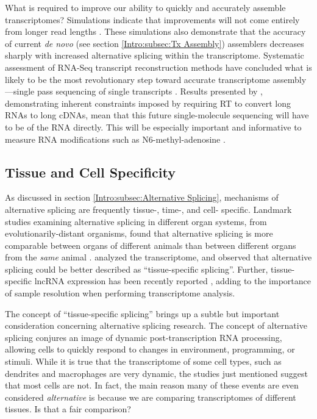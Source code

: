     What is required to improve our ability to quickly and accurately assemble transcriptomes? Simulations indicate that improvements will not come entirely from longer read lengths \citep{Chang2014c}. These simulations also demonstrate that the accuracy of current \textit{de novo} (see section \ref{Intro:subsec:Tx Assembly}) assemblers decreases sharply with increased alternative splicing within the transcriptome. Systematic assessment of RNA-Seq transcript reconstruction methods have concluded what is likely to be the most revolutionary step toward accurate transcriptome assembly---single pass sequencing of single transcripts \citep{Engstrom2013,Steijger2013}. Results presented by \citep{Sharon2013}, demonstrating inherent constraints imposed by requiring RT to convert long RNAs to long cDNAs, mean that this future single-molecule sequencing will have to be of the RNA directly. This will be especially important and informative to measure RNA modifications such as N6-methyl-adenosine \citep{Pan2013}.

  \subsection{Tissue and Cell Specificity}
    \label{Disc:subsec:Tissue-specific Tx expression}

    As discussed in section \ref{Intro:subsec:Alternative Splicing}, mechanisms of alternative splicing are frequently tissue-, time-, and cell- specific. Landmark studies examining alternative splicing in different organ systems, from evolutionarily-distant organisms, found that alternative splicing is more comparable between organs of different animals than between different organs from the \textit{same} animal \citep{Barbosa-Morais2012,Merkin2012}. \citet{Brown2014} analyzed the \flies{} transcriptome, and observed that alternative splicing could be better described as ``tissue-specific splicing''. Further, tissue-specific lncRNA expression has been recently reported \citep{Washietl2014}, adding to the importance of sample resolution when performing transcriptome analysis.

    The concept of ``tissue-specific splicing'' brings up a subtle but important consideration concerning alternative splicing research. The concept of alternative splicing conjures an image of dynamic post-transcription RNA processing, allowing cells to quickly respond to changes in environment, programming, or stimuli. While it is true that the transcriptome of some cell types, such as dendrites and macrophages are very dynamic, the studies just mentioned suggest that most cells are not. In fact, the main reason many of these events are even considered \textit{alternative} is because we are comparing transcriptomes of different tissues. Is that a fair comparison?

